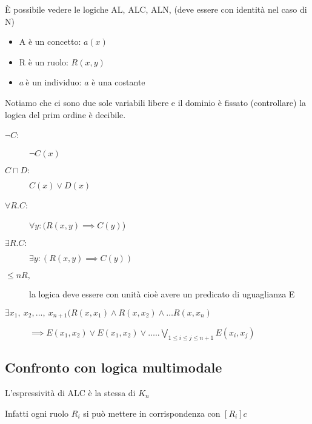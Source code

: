 È possibile vedere le logiche AL, ALC, ALN, (deve essere con identità
nel caso di N)
\begin{itemize}
\item A è un concetto: $a(x)$
\item R è un ruolo: $R(x,y)$
\item $a\ $è un individuo: $a$ è una costante
\end{itemize}
Notiamo che ci sono due sole variabili libere e il dominio è fissato
(controllare) la logica del prim ordine è decibile.
\begin{description}
\item [{$\neg C$:}] $\neg C(x)$
\item [{$C\sqcap D\mathbf{:}$}] \foreignlanguage{english}{$C(x)\vee D(x)$}
\item [{$\forall R.C$:}] $\forall y:(R(x,y)\implies C(y)$)
\item [{$\exists R.C:$}] $\exists y:(R(x,y)\implies C(y))$
\item [{$\leq nR$$,$}] la logica deve essere con unità cioè avere un
predicato di uguaglianza E
\item [{$\exists x_{1},\ x_{2},...,\ x_{n+1}(R(x,x_{1})\wedge R(x,x_{2})\wedge\dots R(x,x_{n})$}] $\implies E(x_{1},x_{2})\vee E(x_{1},x_{2})\vee\dots..\underset{1\leq i\leq j\leq n+1}{\bigvee}E(x_{i},x_{j})$
\end{description}

\subsection{Confronto con logica multimodale}

\noindent L'espressività di ALC è la stessa di $K_{n}$ 

\noindent Infatti ogni ruolo $R_{i}$ si può mettere in corrispondenza
con $[R_{i}]c$


